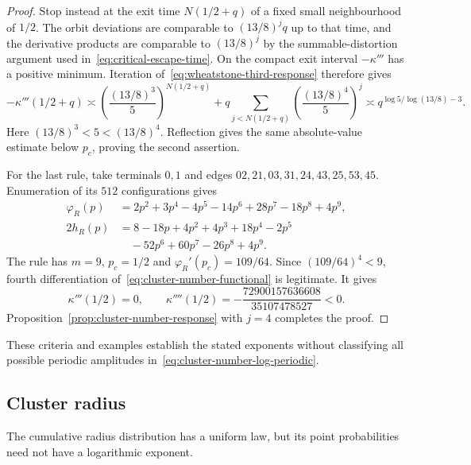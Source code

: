 \documentclass[scheme=plain,11pt]{ctexart}
\theoremstyle{definition}
\theoremstyle{remark}
\begin{document}
\begin{proof}
Stop instead at the exit time $N(1/2+q)$ of a fixed small neighbourhood of $1/2$.
The orbit deviations are comparable to $(13/8)^j q$ up to that time, and the derivative products are comparable to $(13/8)^j$ by the summable-distortion argument used in~\eqref{eq:critical-escape-time}.
On the compact exit interval $-\kappa'''$ has a positive minimum.
Iteration of~\eqref{eq:wheatstone-third-response} therefore gives
\[
 -\kappa'''(1/2+q)\asymp
 \left(\frac{(13/8)^3}{5}\right)^{N(1/2+q)}
 +q\sum_{j<N(1/2+q)}\left(\frac{(13/8)^4}{5}\right)^j
 \asymp q^{\log5/\log(13/8)-3}.
\]
Here $(13/8)^3<5<(13/8)^4$.
Reflection gives the same absolute-value estimate below $p_c$, proving the second assertion.

For the last rule, take terminals $0,1$ and edges
$02,21,03,31,24,43,25,53,45$.
Enumeration of its $512$ configurations gives
\begin{align*}
 \varphi_R(p)&=2p^2+3p^4-4p^5-14p^6+28p^7-18p^8+4p^9,\\
 2h_R(p)&=8-18p+4p^2+4p^3+18p^4-2p^5\\
 &\quad-52p^6+60p^7-26p^8+4p^9.
\end{align*}
The rule has $m=9$, $p_c=1/2$ and $\varphi_R'(p_c)=109/64$.
Since $(109/64)^4<9$, fourth differentiation of~\eqref{eq:cluster-number-functional} is legitimate.
It gives
\[
 \kappa'''(1/2)=0,\qquad
 \kappa''''(1/2)=-\frac{72900157636608}{35107478527}<0.
\]
Proposition~\ref{prop:cluster-number-response} with $j=4$ completes the proof.
\end{proof}

These criteria and examples establish the stated exponents without classifying all possible periodic amplitudes in~\eqref{eq:cluster-number-log-periodic}.


\subsection*{Cluster radius}
The cumulative radius distribution has a uniform law, but its point probabilities need not have a logarithmic exponent.
\end{document}

